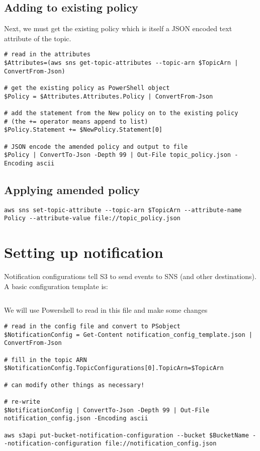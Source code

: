 \subsection{Adding to existing policy}
\label{adding-to-existing-policy}

Next, we must get the existing policy which is itself a JSON encoded text attribute of the topic.

\begin{verbatim}
# read in the attributes
$Attributes=(aws sns get-topic-attributes --topic-arn $TopicArn | ConvertFrom-Json)

# get the existing policy as PowerShell object
$Policy = $Attributes.Attributes.Policy | ConvertFrom-Json

# add the statement from the New policy on to the existing policy
# (the += operator means append to list)
$Policy.Statement += $NewPolicy.Statement[0]

# JSON encode the amended policy and output to file
$Policy | ConvertTo-Json -Depth 99 | Out-File topic_policy.json -Encoding ascii
\end{verbatim}

\subsection{Applying amended policy}
\label{applying-amended-policy}

\begin{verbatim}
aws sns set-topic-attribute --topic-arn $TopicArn --attribute-name Policy --attribute-value file://topic_policy.json
\end{verbatim}

\section{Setting up notification}\label{setting-up-notification}

Notification configurations tell S3 to send events to SNS (and other destinations).
A basic configuration template is:

\inputminted{json}{notification_config_template.json}

We will use Powershell to read in this file and make some changes

\begin{verbatim}
# read in the config file and convert to PSobject
$NotificationConfig = Get-Content notification_config_template.json | ConvertFrom-Json

# fill in the topic ARN
$NotificationConfig.TopicConfigurations[0].TopicArn=$TopicArn

# can modify other things as necessary!

# re-write
$NotificationConfig | ConvertTo-Json -Depth 99 | Out-File notification_config.json -Encoding ascii

aws s3api put-bucket-notification-configuration --bucket $BucketName --notification-configuration file://notification_config.json
\end{verbatim}

